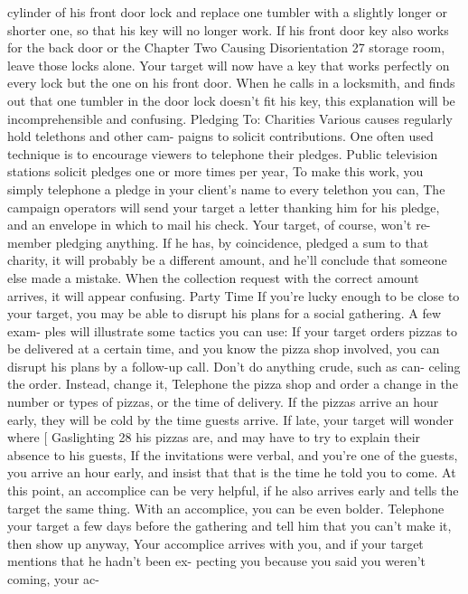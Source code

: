 \documentclass{book}
\begin{document}
cylinder of his front door lock and replace one tumbler with a 
slightly longer or shorter one, so that his key will no longer 
work. If his front door key also works for the back door or the 
Chapter Two 
Causing Disorientation 
27 
storage room, leave those locks alone. Your target will now 
have a key that works perfectly on every lock but the one on his 
front door. When he calls in a locksmith, and finds out that one 
tumbler in the door lock doesn't fit his key, this explanation will 
be incomprehensible and confusing. 
Pledging To: Charities 
Various causes regularly hold telethons and other cam- 
paigns to solicit contributions. One often used technique is to 
encourage viewers to telephone their pledges. Public television 
stations solicit pledges one or more times per year, To make 
this work, you simply telephone a pledge in your client's name 
to every telethon you can, The campaign operators will send 
your target a letter thanking him for his pledge, and an envelope 
in which to mail his check. Your target, of course, won't re- 
member pledging anything. If he has, by coincidence, pledged a 
sum to that charity, it will probably be a different amount, and 
he'll conclude that someone else made a mistake. When the 
collection request with the correct amount arrives, it will appear 
confusing. 
Party Time 
If you're lucky enough to be close to your target, you may 
be able to disrupt his plans for a social gathering. A few exam- 
ples will illustrate some tactics you can use: 
If your target orders pizzas to be delivered at a certain time, 
and you know the pizza shop involved, you can disrupt his 
plans by a follow-up call. Don't do anything crude, such as can- 
celing the order. Instead, change it, Telephone the pizza shop 
and order a change in the number or types of pizzas, or the time 
of delivery. If the pizzas arrive an hour early, they will be cold 
by the time guests arrive. If late, your target will wonder where  [ Gaslighting 
28 
his pizzas are, and may have to try to explain their absence to 
his guests, 
If the invitations were verbal, and you're one of the guests, 
you arrive an hour early, and insist that that is the time he told 
you to come. At this point, an accomplice can be very helpful, 
if he also arrives early and tells the target the same thing. 
With an accomplice, you can be even bolder. Telephone 
your target a few days before the gathering and tell him that you 
can't make it, then show up anyway, Your accomplice arrives 
with you, and if your target mentions that he hadn't been ex- 
pecting you because you said you weren't coming, your ac- 
\end{document}
